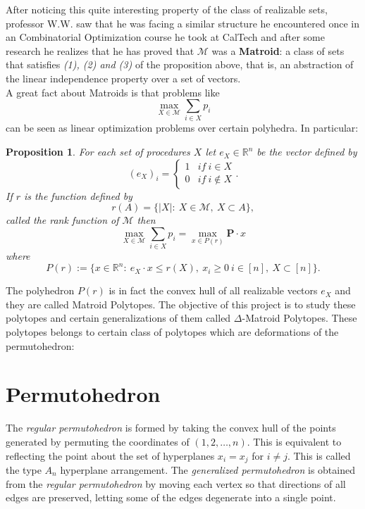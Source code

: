 \documentclass[12pt]{amsart}
\newtheorem{propo}[lemma]{Proposition}
\numberwithin{equation}{section}
\newcommand{\rr}{\mathbb{R}}
\begin{document}
After noticing this quite interesting property of the class of realizable sets, professor W.W. saw that he was facing a similar structure he encountered once in an Combinatorial Optimization course he took at CalTech and after some research he realizes that he has proved that $\mathcal{M}$ was a \textbf{Matroid}:  a class of sets that satisfies \textit{(1), (2) and (3)} of the proposition above, that is, an abstraction of the linear independence property over a set of vectors. \\
A great fact about Matroids is that problems like 
$$
\max_{X\in \mathcal{M}} \sum_{i\in X}p_i
$$       
can be seen as linear optimization problems over certain polyhedra. In particular:
\begin{propo}
For each set of procedures $X$ let $e_X\in\rr^n$ be the vector defined by
$$
(e_{X})_i=\begin{cases}1 & if \ i\in X \\ 0 & if \ i\notin X \end{cases}.
$$ 
If $r$ is the function defined by 
$$ 
r(A)=\{|X|:\ X\in\mathcal{M}, \ X\subset A\},
$$ 
called the rank function of $\mathcal{M}$ then
$$
\max_{X\in \mathcal{M}}\sum_{i\in X}p_i=\max_{x\in P(r)}\textbf{P}\cdot x 
$$
where 
$$
P(r):=\{x\in \rr^{n}: \  e_{X}\cdot x\leq r(X), \  x_i\geq 0 \ i\in[n], \ X\subset [n]\}.
$$
\end{propo}
The polyhedron $P(r)$ is in fact the convex hull of all realizable vectors $e_X$ and they are called Matroid Polytopes. The objective of this project is to study these polytopes and certain generalizations of them called $\Delta$-Matroid Polytopes. These polytopes belongs to certain class of polytopes which are deformations of the permutohedron: \\






\section{Permutohedron}
The {\em regular permutohedron} is formed by taking the convex hull of the points generated by permuting the coordinates
of $(1,2, \dots , n)$.  This is equivalent to reflecting the point about the set of hyperplanes $x_i=x_j$ for $i\neq j$.  This is called the 
type $A_n$ hyperplane arrangement. The {\em generalized permutohedron} is obtained from the {\em regular permutohedron} by moving each vertex so that directions of all edges are preserved, letting some of the edges degenerate into a single point. 
\end{document}
